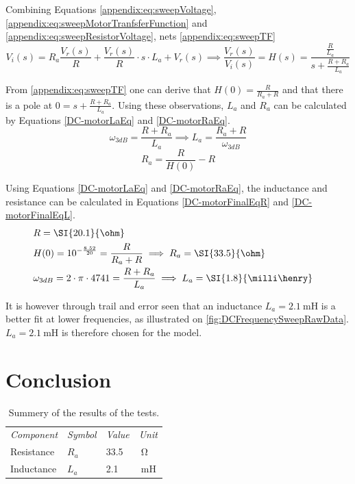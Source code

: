 Combining Equations \ref{appendix:eq:sweepVoltage}, \ref{appendix:eq:sweepMotorTranfsferFunction} and \ref{appendix:eq:sweepResistorVoltage}, nets \autoref{appendix:eq:sweepTF}
\begin{equation} 
V_i(s) = R_a \frac{V_r(s)}{R} + \frac{V_r(s)}{R} \cdot s \cdot L_a + V_r(s) \implies \frac{V_r(s)}{V_i(s)} = H(s) = \frac{\frac{R}{L_a}}{s+\frac{R+R_a}{L_a}} \label{appendix:eq:sweepTF}
\end{equation}

From \autoref{appendix:eq:sweepTF} one can derive that $H (0) = \frac{R}{R_a+R}$ and that there is a pole at $0 = s + \frac{R+R_a}{L_a}$.
Using these observations, $L_a$ and $R_a$ can be calculated by Equations \ref{DC-motorLaEq} and \ref{DC-motorRaEq}.
\begin{equation}
	\omega_{3dB} = \frac{R+R_a}{L_a} \implies L_a = \frac{R_a+R}{\omega_{3dB}}
	\label{DC-motorLaEq}
\end{equation}
\startexplain
{}
\stopexplain
\begin{equation}
	R_a = \frac{R}{H (0)}-R
	\label{DC-motorRaEq}
\end{equation}

Using Equations \ref{DC-motorLaEq} and \ref{DC-motorRaEq}, the inductance and resistance can be calculated in Equations \ref{DC-motorFinalEqR} and \ref{DC-motorFinalEqL}.
\begin{subequations}
	\begin{align}
	&\notag R = \SI{20.1}{\ohm}\\
	&H (0) = 10^{-\frac{8.52}{20}}  =\frac{R}{R_a+R} \implies R_a = \SI{33.5}{\ohm}\label{DC-motorFinalEqR}\\
	&\omega_{3dB} = 2\cdot\pi\cdot 4741 = \frac{R+R_a}{L_a}  \implies L_a = \SI{1.8}{\milli\henry}
	&\label{DC-motorFinalEqL}
	\end{align}
\end{subequations}

It is however through trail and error seen that an inductance $L_a=\SI{2.1}{\milli\henry}$ is a better fit at lower frequencies, as illustrated on \autoref{fig:DCFrequencySweepRawData}. $L_a=\SI{2.1}{\milli\henry}$ is therefore chosen for the model.

\section*{Conclusion}
\begin{table}[h!]
	\centering
	\caption{Summery of the results of the tests.}
\begin{tabular}{llll}
\textit{Component}	&	\textit{Symbol} &  	\textit{Value} &  \textit{Unit} \\ \rowcolor{lightGrey} \toprule
Resistance				&	$R_a$	& \SI{33.5}{} 			   & $\SI{}{\ohm}$ \\
Inductance				&	$L_a$	& \SI{2.1}{}			   & $\SI{}{\milli\henry}$ 
\end{tabular}\label{tab:Dc-motorconst}
\end{table}
		
		